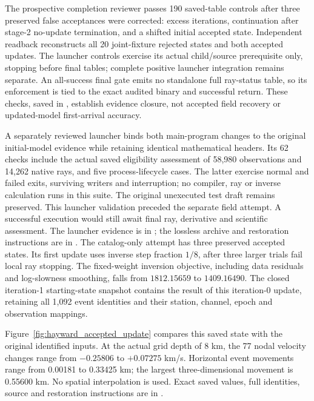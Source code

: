 The prospective completion reviewer passes 190 saved-table controls after
three preserved false acceptances were corrected: excess iterations,
continuation after stage-2 no-update termination, and a shifted initial
accepted state. Independent readback reconstructs all 20 joint-fixture
rejected states and both accepted updates. The launcher controls exercise
its actual child/source prerequisite only, stopping before final tables;
complete positive launcher integration remains separate. An all-success
final gate emits no standalone full ray-status table, so its enforcement
is tied to the exact audited binary and successful return. These checks,
saved in ,
establish evidence closure, not accepted field recovery or updated-model
first-arrival accuracy.

A separately reviewed launcher binds both main-program changes to the
original initial-model evidence while retaining identical mathematical
headers. Its 62 checks include the actual saved eligibility assessment of
58,980 observations and 14,262 native rays, and five process-lifecycle
cases. The latter exercise normal and failed exits, surviving writers and
interruption; no compiler, ray or inverse calculation runs in this suite.
The original unexecuted test draft remains preserved. This launcher validation
preceded the separate field attempt. A successful execution would still await
final ray, derivative and scientific assessment. The launcher evidence is in
;
the lossless archive and restoration instructions are in
.
The catalog-only attempt has three preserved accepted states. Its first
update uses inverse step fraction $1/8$, after three larger trials
fail local ray stopping. The fixed-weight inversion objective, including
data residuals and log-slowness smoothing, falls from $1812.15659$ to
$1409.16490$. The closed iteration-1 starting-state snapshot
contains the result of this iteration-0 update, retaining all 1,092 event
identities and their station, channel, epoch and observation mappings.

Figure~\ref{fig:hayward_accepted_update} compares this saved state with the
original identified inputs. At the actual grid depth of 8 km, the 77 nodal
velocity changes range from $-0.25806$ to $+0.07275$ km/s. Horizontal event
movements range from 0.00181 to 0.33425 km; the largest three-dimensional
movement is 0.55600 km. No spatial interpolation is used. Exact saved values,
full identities, source and restoration instructions are in
.

